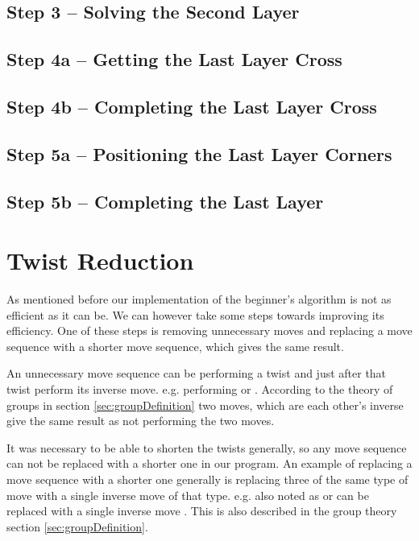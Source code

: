 \subsection{Step 3 -- Solving the Second Layer}

\subsection{Step 4a --  Getting the Last Layer Cross}

\subsection{Step 4b -- Completing the Last Layer Cross}

\subsection{Step 5a -- Positioning the Last Layer Corners}

\subsection{Step 5b -- Completing the Last Layer}


\section{Twist Reduction}
As mentioned before our implementation of the beginner's algorithm is not as efficient as it can be. We can however take some steps towards improving its efficiency. One of these steps is removing unnecessary moves and replacing a move sequence with a shorter move sequence, which gives the same result.

An unnecessary move sequence can be performing a twist and just after that twist perform its inverse move. e.g. performing  or .
According to the theory of groups in section \ref{sec:groupDefinition} two moves, which are each other's inverse give the same result as not performing the two moves.

It was necessary to be able to shorten the twists generally, so any move sequence can not be replaced with a shorter one in our program.
An example of replacing a move sequence with a shorter one generally is replacing three of the same type of move with a single inverse move of that type. e.g.  also noted as  or  can be replaced with a single inverse move . This is also described in the group theory section \ref{sec:groupDefinition}.



